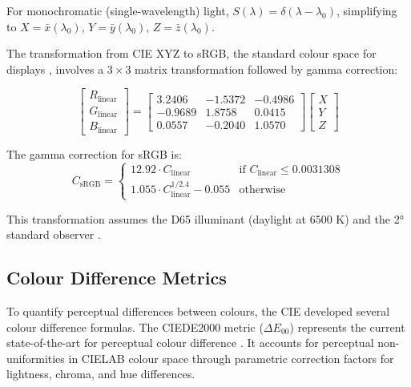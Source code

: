 \documentclass[12pt,a4paper]{article}
\newcommand{\wavelength}{\lambda}
\newcommand{\deltaE}{\Delta E_{00}}
\begin{document}
For monochromatic (single-wavelength) light, $S(\wavelength) = \delta(\wavelength - \wavelength_0)$, simplifying to $X = \bar{x}(\wavelength_0)$, $Y = \bar{y}(\wavelength_0)$, $Z = \bar{z}(\wavelength_0)$.

The transformation from CIE XYZ to sRGB, the standard colour space for displays \cite{stokes1996srgb,iec1999iec}, involves a $3 \times 3$ matrix transformation followed by gamma correction:

\begin{equation}
\begin{bmatrix} R_{\text{linear}} \\ G_{\text{linear}} \\ B_{\text{linear}} \end{bmatrix} = 
\begin{bmatrix}
3.2406 & -1.5372 & -0.4986 \\
-0.9689 & 1.8758 & 0.0415 \\
0.0557 & -0.2040 & 1.0570
\end{bmatrix}
\begin{bmatrix} X \\ Y \\ Z \end{bmatrix}
\end{equation}

The gamma correction for sRGB is:
\begin{equation}
C_{\text{sRGB}} = \begin{cases}
12.92 \cdot C_{\text{linear}} & \text{if } C_{\text{linear}} \leq 0.0031308 \\
1.055 \cdot C_{\text{linear}}^{1/2.4} - 0.055 & \text{otherwise}
\end{cases}
\end{equation}

This transformation assumes the D65 illuminant (daylight at 6500 K) and the 2° standard observer \cite{wyszecki2000color}.

\subsection{Colour Difference Metrics}

To quantify perceptual differences between colours, the CIE developed several colour difference formulas. The CIEDE2000 metric ($\deltaE$) represents the current state-of-the-art for perceptual colour difference \cite{sharma2005ciede2000,luo2001development}. It accounts for perceptual non-uniformities in CIELAB colour space through parametric correction factors for lightness, chroma, and hue differences.
\end{document}
